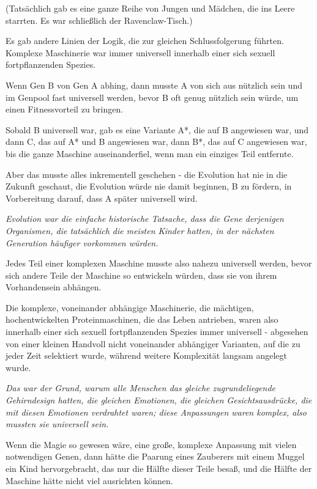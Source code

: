 {(Tatsächlich gab es eine ganze Reihe von Jungen und Mädchen, die ins Leere starrten. Es war schließlich der Ravenclaw-Tisch.)

Es gab andere Linien der Logik, die zur gleichen Schlussfolgerung führten. Komplexe Maschinerie war immer universell innerhalb einer sich sexuell fortpflanzenden Spezies.

Wenn Gen B von Gen A abhing, dann musste A von sich aus nützlich sein und im Genpool fast universell werden, bevor B oft genug nützlich sein würde, um einen Fitnessvorteil zu bringen.

Sobald B universell war, gab es eine Variante A*, die auf B angewiesen war, und dann C, das auf A* und B angewiesen war, dann B*, das auf C angewiesen war, bis die ganze Maschine auseinanderfiel, wenn man ein einziges Teil entfernte.

Aber das musste alles inkrementell geschehen - die Evolution hat nie in die Zukunft geschaut, die Evolution würde nie damit beginnen, B zu fördern, in Vorbereitung darauf, dass A später universell wird.

\emph{Evolution war die einfache historische Tatsache, dass die Gene derjenigen Organismen, die tatsächlich die meisten Kinder hatten, in der nächsten Generation häufiger vorkommen würden.}

Jedes Teil einer komplexen Maschine musste also nahezu universell werden, bevor sich andere Teile der Maschine so entwickeln würden, dass sie von ihrem Vorhandensein abhängen.

Die komplexe, voneinander abhängige Maschinerie, die mächtigen, hochentwickelten Proteinmaschinen, die das Leben antrieben, waren also innerhalb einer sich sexuell fortpflanzenden Spezies immer universell - abgesehen von einer kleinen Handvoll nicht voneinander abhängiger Varianten, auf die zu jeder Zeit selektiert wurde, während weitere Komplexität langsam angelegt wurde.

\emph{Das war der Grund, warum alle Menschen das gleiche zugrundeliegende Gehirndesign hatten, die gleichen Emotionen, die gleichen Gesichtsausdrücke, die mit diesen Emotionen verdrahtet waren; diese Anpassungen waren komplex, also mussten sie universell sein.}

Wenn die Magie so gewesen wäre, eine große, komplexe Anpassung mit vielen notwendigen Genen, dann hätte die Paarung eines Zauberers mit einem Muggel ein Kind hervorgebracht, das nur die Hälfte dieser Teile besaß, und die Hälfte der Maschine hätte nicht viel ausrichten können.

}
